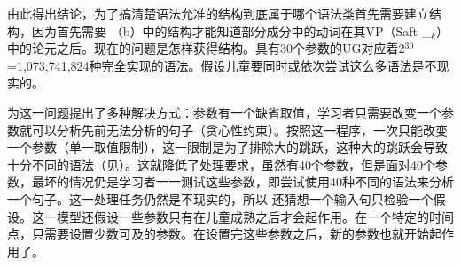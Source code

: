  \citet{Fodor98a,Fodor98b}由此得出结论，为了搞清楚语法允准的结构到底属于哪个语法类首先需要建立结构，因为首先需要 （b）中的结构才能知道部分成分中的动词在其VP（Saft \_$_k$）中的论元之后。现在的问题是怎样获得结构。具有30个参数的UG对应着2$^{30}$=1,073,741,824种完全实现的语法。假设儿童要同时或依次尝试这么多语法是不现实的。

 \citet{GW94a}为这一问题提出了多种解决方式：参数有一个缺省取值，学习者只需要改变一个参数就可以分析先前无法分析的句子（贪心性约束）。按照这一程序，一次只能改变一个参数（单一取值限制），这一限制是为了排除大的跳跃，这种大的跳跃会导致十分不同的语法（见\citealp[--613]{BN96a}）。这就降低了处理要求，虽然有40个参数，但是面对40个参数，最坏的情况仍是学习者一一测试这些参数，即尝试使用40种不同的语法来分析一个句子。这一处理任务仍然是不现实的，所以 \citet[]{GW94a}还猜想一个输入句只检验一个假设。这一模型还假设一些参数只有在儿童成熟之后才会起作用。在一个特定的时间点，只需要设置少数可及的参数。在设置完这些参数之后，新的参数也就开始起作用了。


